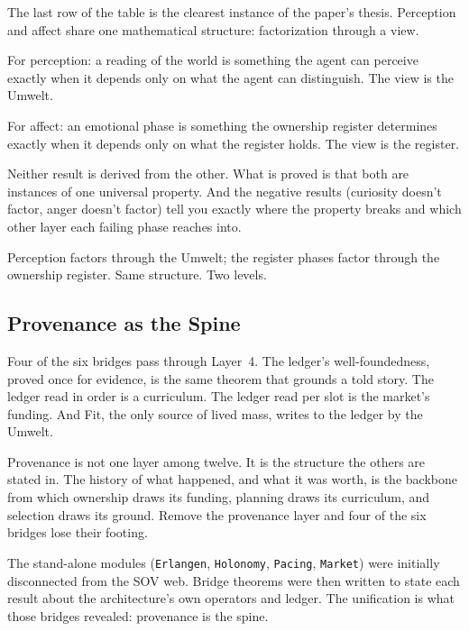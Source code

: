 \documentclass[11pt]{article}
\newcommand{\sov}{\textsc{SOV}}
\newcommand{\leanus}{\textunderscore\allowbreak}
\newcommand{\lean}[1]{{\let\_\leanus\texttt{#1}}}
\theoremstyle{remark}
\begin{document}
The last row of the table is the clearest instance of the paper's thesis. Perception and
affect share one mathematical structure: factorization through a view.

For perception: a reading of the world is something the agent can perceive exactly when it
depends only on what the agent can distinguish. The view is the Umwelt.

For affect: an emotional phase is something the ownership register determines exactly when
it depends only on what the register holds. The view is the register.

Neither result is derived from the other. What is proved is that both are instances of one
universal property. And the negative results (curiosity doesn't factor, anger doesn't
factor) tell you exactly where the property breaks and which other layer each failing
phase reaches into.

Perception factors through the Umwelt; the register phases factor through the ownership
register. Same structure. Two levels.

\subsection{Provenance as the Spine}

Four of the six bridges pass through Layer~4. The ledger's well-foundedness, proved once
for evidence, is the same theorem that grounds a told story. The ledger read in order is a
curriculum. The ledger read per slot is the market's funding. And Fit, the only source of
lived mass, writes to the ledger by the Umwelt.

Provenance is not one layer among twelve. It is the structure the others are stated in. The
history of what happened, and what it was worth, is the backbone from which ownership draws
its funding, planning draws its curriculum, and selection draws its ground. Remove the
provenance layer and four of the six bridges lose their footing.

The stand-alone modules (\lean{Erlangen}, \lean{Holonomy}, \lean{Pacing}, \lean{Market})
were initially disconnected from the \sov{} web. Bridge theorems were then written to state
each result about the architecture's own operators and ledger. The unification is what
those bridges revealed: provenance is the spine.


\end{document}
